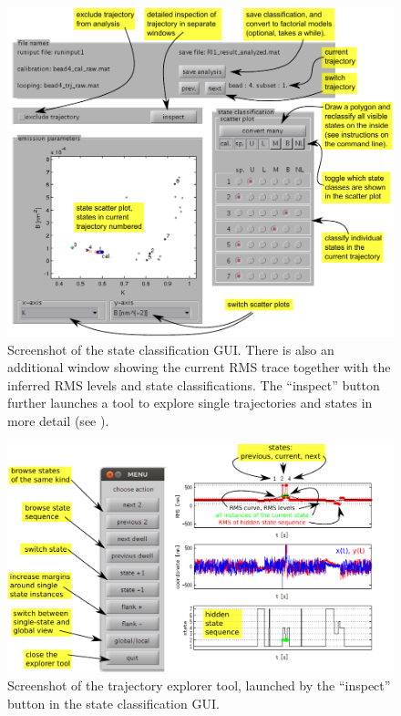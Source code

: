 \begin{figure}
  \begin{center}
    \includegraphics{figures/GUI_manual.pdf}    
  \end{center}
  \caption{Screenshot of the state classification GUI. There is also
    an additional window showing the current RMS trace together with
    the inferred RMS levels and state classifications. The ``inspect''
    button further launches a tool to explore single trajectories and
    states in more detail (see ).}\label{fig:postprocess}
\end{figure}

\begin{figure}
  \begin{center}
    \includegraphics{figures/trajectory_explorer.pdf}    
  \end{center}
  \caption{Screenshot of the trajectory explorer tool, launched by the
    ``inspect'' button in the state classification
    GUI.}\label{fig:trjexplore}
\end{figure}


